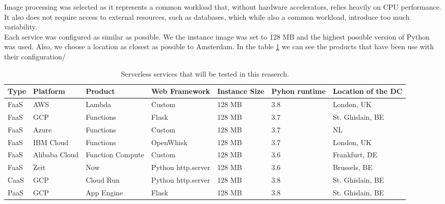 \documentclass[11pt]{article}
\begin{document}
Image processing was selected as it represents a common workload that, without hardware accelerators, relies heavily on CPU performance. It also does not require access to external resources, such as databases, which while also a common workload, introduce too much variability. \\

Each service was configured as similar as possible. We the instance image was set to 128 MB and the highest possible version of Python was used. Also, we choose a location as closest as possible to Amsterdam. In the table \ref{Tab:services} we can see the products that have been use with their configuration/




\begin{table}
\begin{adjustwidth}{-0.9cm}{}
 \begin{tabularx}{1.1\textwidth}{p{1cm} X X X X X p{3cm}}
 \textbf{Type} & \textbf{Platform} & \textbf{Product} & \textbf{Web Framework} & \textbf{Instance Size} & \textbf{Pyhon runtime} & \textbf{Location of the DC} \\
 \hline
 \hline
 FaaS & AWS & Lambda & Custom & 128 MB & 3.8 & London, UK \\
 \hline
 FaaS & GCP & Functions & Flask & 128 MB & 3.7 & St. Ghislain, BE \\
 \hline
 FaaS & Azure & Functions & Custom & 128 MB & 3.7 & NL \\
 \hline
 FaaS & IBM Cloud & Functions & OpenWhisk & 128 MB & 3.7 & London, UK\\
 \hline
 FaaS & Alibaba Cloud & Function Compute & Custom & 128 MB & 3.6 & Frankfurt, DE\\
 \hline
 FaaS & Zeit & Now & Python http.server  & 128 MB & 3.6 & Brussels, BE\\
 \hline
 CaaS & GCP & Cloud Run & Python http.server & 128 MB & 3.8 & St. Ghislain, BE\\
 \hline
 PaaS & GCP & App Engine & Flask & 128 MB & 3.8 & St. Ghislain, BE\\
 \hline

\end{tabularx}
\caption{Serverless services that will be tested in this reaserch.}
\label{Tab:services}
\end{adjustwidth}
\end{table}
\end{document}
